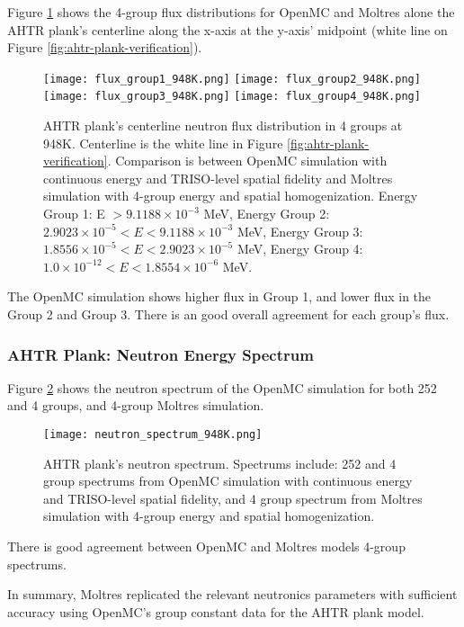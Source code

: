 Figure \ref{fig:flux_948K} shows the 4-group flux distributions for OpenMC and 
Moltres alone the \gls{AHTR} plank's centerline along the x-axis at the y-axis' 
midpoint (white line on Figure \ref{fig:ahtr-plank-verification}). 
\begin{figure}[htbp]
    \centering
    \texttt{[image: flux\_group1\_948K.png]} 
    \texttt{[image: flux\_group2\_948K.png]} 
    \texttt{[image: flux\_group3\_948K.png]} 
    \texttt{[image: flux\_group4\_948K.png]} 
    \caption{\acrfull{AHTR} plank's centerline neutron flux distribution 
    in 4 groups at 948K. 
    Centerline is the white line in Figure \ref{fig:ahtr-plank-verification}.
    Comparison is between OpenMC simulation with continuous energy 
    and TRISO-level spatial fidelity and Moltres simulation with 4-group energy and 
    spatial homogenization.  
    Energy Group 1: E $> 9.1188 \times 10^{-3}$ MeV, 
    Energy Group 2: $2.9023 \times 10^{-5} < E < 9.1188 \times 10^{-3}$ MeV,
    Energy Group 3:  $1.8556 \times 10^{-5} < E < 2.9023 \times 10^{-5}$ MeV,
    Energy Group 4:  $1.0 \times 10^{-12} < E < 1.8554 \times 10^{-6}$ MeV.}
    \label{fig:flux_948K}
\end{figure}

The OpenMC simulation shows higher flux in Group 1, and lower flux in the
Group 2 and Group 3. 
There is an good overall agreement for each group's flux.

\subsubsection{AHTR Plank: Neutron Energy Spectrum}
Figure \ref{fig:neutron_spectrum_948K} shows the neutron spectrum of the OpenMC 
simulation for both 252 and 4 groups, and 4-group Moltres simulation. 
 \begin{figure}[htbp]
    \centering
    \texttt{[image: neutron\_spectrum\_948K.png]}
    \caption{\acrfull{AHTR} plank's neutron spectrum. Spectrums include: 252 
    and 4 group spectrums from OpenMC simulation with continuous energy and 
    TRISO-level spatial fidelity, and 4 group spectrum from Moltres simulation with 
    4-group energy and spatial homogenization.}  
    \label{fig:neutron_spectrum_948K}
\end{figure}
There is good agreement between OpenMC and Moltres models 4-group spectrums. 

In summary, Moltres replicated the relevant neutronics parameters with sufficient 
accuracy using OpenMC's group constant data for the \gls{AHTR} plank model. 

